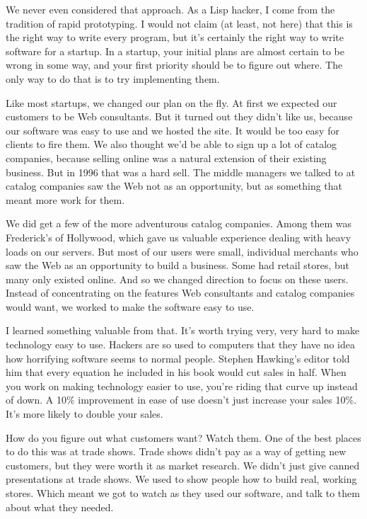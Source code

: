 \documentclass[12pt]{book}
\begin{document}
We never even considered that approach. As a Lisp hacker, I come from
the tradition of rapid prototyping. I would not claim (at least, not
here) that this is the right way to write every program, but it's
certainly the right way to write software for a startup. In a startup,
your initial plans are almost certain to be wrong in some way, and your
first priority should be to figure out where. The only way to do that is
to try implementing them.

Like most startups, we changed our plan on the fly. At first we expected
our customers to be Web consultants. But it turned out they didn't like
us, because our software was easy to use and we hosted the site. It
would be too easy for clients to fire them. We also thought we'd be able
to sign up a lot of catalog companies, because selling online was a
natural extension of their existing business. But in 1996 that was a
hard sell. The middle managers we talked to at catalog companies saw the
Web not as an opportunity, but as something that meant more work for
them.

We did get a few of the more adventurous catalog companies. Among them
was Frederick's of Hollywood, which gave us valuable experience dealing
with heavy loads on our servers. But most of our users were small,
individual merchants who saw the Web as an opportunity to build a
business. Some had retail stores, but many only existed online. And so
we changed direction to focus on these users. Instead of concentrating
on the features Web consultants and catalog companies would want, we
worked to make the software easy to use.

I learned something valuable from that. It's worth trying very, very
hard to make technology easy to use. Hackers are so used to computers
that they have no idea how horrifying software seems to normal people.
Stephen Hawking's editor told him that every equation he included in his
book would cut sales in half. When you work on making technology easier
to use, you're riding that curve up instead of down. A 10\% improvement
in ease of use doesn't just increase your sales 10\%. It's more likely
to double your sales.

How do you figure out what customers want? Watch them. One of the best
places to do this was at trade shows. Trade shows didn't pay as a way of
getting new customers, but they were worth it as market research. We
didn't just give canned presentations at trade shows. We used to show
people how to build real, working stores. Which meant we got to watch as
they used our software, and talk to them about what they needed.
\end{document}
